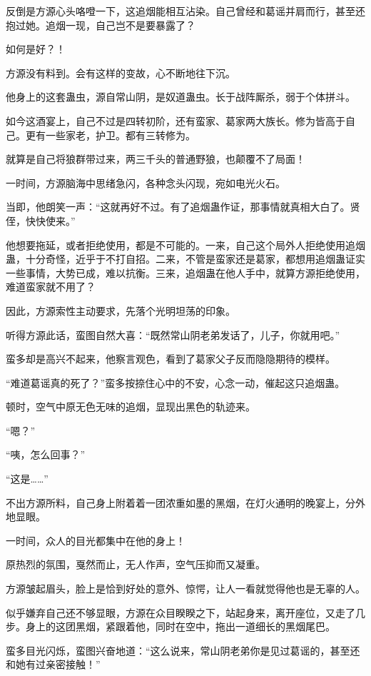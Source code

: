 \begin{this_body}
反倒是方源心头咯噔一下，这追烟能相互沾染。自己曾经和葛谣并肩而行，甚至还抱过她。追烟一现，自己岂不是要暴露了？

如何是好？！

方源没有料到。会有这样的变故，心不断地往下沉。

他身上的这套蛊虫，源自常山阴，是奴道蛊虫。长于战阵厮杀，弱于个体拼斗。

如今这酒宴上，自己不过是四转初阶，还有蛮家、葛家两大族长。修为皆高于自己。更有一些家老，护卫。都有三转修为。

就算是自己将狼群带过来，两三千头的普通野狼，也颠覆不了局面！

一时间，方源脑海中思绪急闪，各种念头闪现，宛如电光火石。

当即，他朗笑一声：“这就再好不过。有了追烟蛊作证，那事情就真相大白了。贤侄，快快使来。”

他想要拖延，或者拒绝使用，都是不可能的。一来，自己这个局外人拒绝使用追烟蛊，十分奇怪，近乎于不打自招。二来，不管是蛮家还是葛家，都想用追烟蛊证实一些事情，大势已成，难以抗衡。三来，追烟蛊在他人手中，就算方源拒绝使用，难道蛮家就不用了？

因此，方源索性主动要求，先落个光明坦荡的印象。

听得方源此话，蛮图自然大喜：“既然常山阴老弟发话了，儿子，你就用吧。”

蛮多却是高兴不起来，他察言观色，看到了葛家父子反而隐隐期待的模样。

“难道葛谣真的死了？”蛮多按捺住心中的不安，心念一动，催起这只追烟蛊。

顿时，空气中原无色无味的追烟，显现出黑色的轨迹来。

“嗯？”

“咦，怎么回事？”

“这是……”

不出方源所料，自己身上附着着一团浓重如墨的黑烟，在灯火通明的晚宴上，分外地显眼。

一时间，众人的目光都集中在他的身上！

原热烈的氛围，戛然而止，无人作声，空气压抑而又凝重。

方源皱起眉头，脸上是恰到好处的意外、惊愕，让人一看就觉得他也是无辜的人。

似乎嫌弃自己还不够显眼，方源在众目睽睽之下，站起身来，离开座位，又走了几步。身上的这团黑烟，紧跟着他，同时在空中，拖出一道细长的黑烟尾巴。

蛮多目光闪烁，蛮图兴奋地道：“这么说来，常山阴老弟你是见过葛谣的，甚至还和她有过亲密接触！”


\end{this_body}
